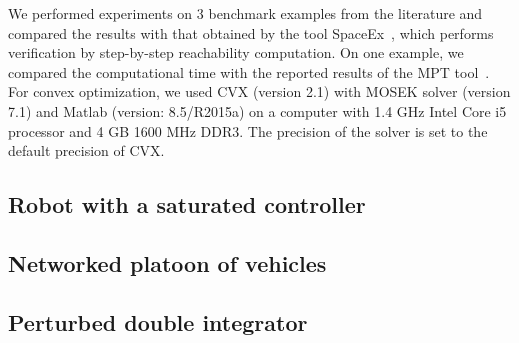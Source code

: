 We performed experiments on $3$ benchmark examples from the literature
and compared the results with that obtained by the tool
SpaceEx~\cite{FLD+11}, which performs verification by step-by-step
reachability computation. On one example, we compared the
computational time with the reported results of the MPT
tool~\cite{rakovic2004computation}.  For convex optimization, we used
CVX (version 2.1) with MOSEK solver (version 7.1) and Matlab (version:
8.5/R2015a) on a computer with 1.4 GHz Intel Core i5 processor and 4
GB 1600 MHz DDR3.  The precision of the solver is set to the default
precision of CVX.


\subsection{Robot with a saturated controller}


\subsection{Networked platoon of vehicles}



\subsection{Perturbed double integrator}

